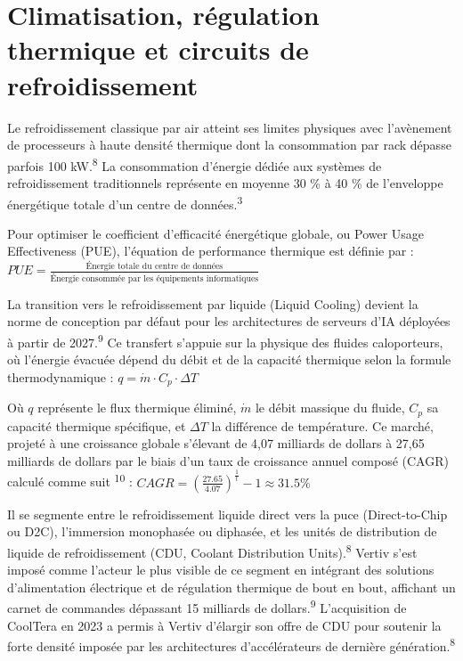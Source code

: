 \documentclass[11pt,a4paper]{article}
\begin{document}
\section*{Climatisation, régulation thermique et circuits de refroidissement}

Le refroidissement classique par air atteint ses limites physiques avec l'avènement de processeurs à haute densité thermique dont la consommation par rack dépasse parfois 100 kW.\textsuperscript{8} La consommation d'énergie dédiée aux systèmes de refroidissement traditionnels représente en moyenne 30 \% à 40 \% de l'enveloppe énergétique totale d'un centre de données.\textsuperscript{3}

Pour optimiser le coefficient d'efficacité énergétique globale, ou Power Usage Effectiveness (PUE), l'équation de performance thermique est définie par :
$PUE = \frac{\text{Énergie totale du centre de données}}{\text{Énergie consommée par les équipements informatiques}}$

La transition vers le refroidissement par liquide (Liquid Cooling) devient la norme de conception par défaut pour les architectures de serveurs d'IA déployées à partir de 2027.\textsuperscript{9} Ce transfert s'appuie sur la physique des fluides caloporteurs, où l'énergie évacuée dépend du débit et de la capacité thermique selon la formule thermodynamique :
$q = \dot{m} \cdot C_p \cdot \Delta T$

Où $q$ représente le flux thermique éliminé, $\dot{m}$ le débit massique du fluide, $C_p$ sa capacité thermique spécifique, et $\Delta T$ la différence de température. Ce marché, projeté à une croissance globale s'élevant de 4,07 milliards de dollars à 27,65 milliards de dollars par le biais d'un taux de croissance annuel composé (CAGR) calculé comme suit \textsuperscript{10} :
$CAGR = \left(\frac{27.65}{4.07}\right)^{\frac{1}{t}} - 1 \approx 31.5\%$

Il se segmente entre le refroidissement liquide direct vers la puce (Direct-to-Chip ou D2C), l'immersion monophasée ou diphasée, et les unités de distribution de liquide de refroidissement (CDU, Coolant Distribution Units).\textsuperscript{8} Vertiv s'est imposé comme l'acteur le plus visible de ce segment en intégrant des solutions d'alimentation électrique et de régulation thermique de bout en bout, affichant un carnet de commandes dépassant 15 milliards de dollars.\textsuperscript{9} L'acquisition de CoolTera en 2023 a permis à Vertiv d'élargir son offre de CDU pour soutenir la forte densité imposée par les architectures d'accélérateurs de dernière génération.\textsuperscript{8}
\end{document}
